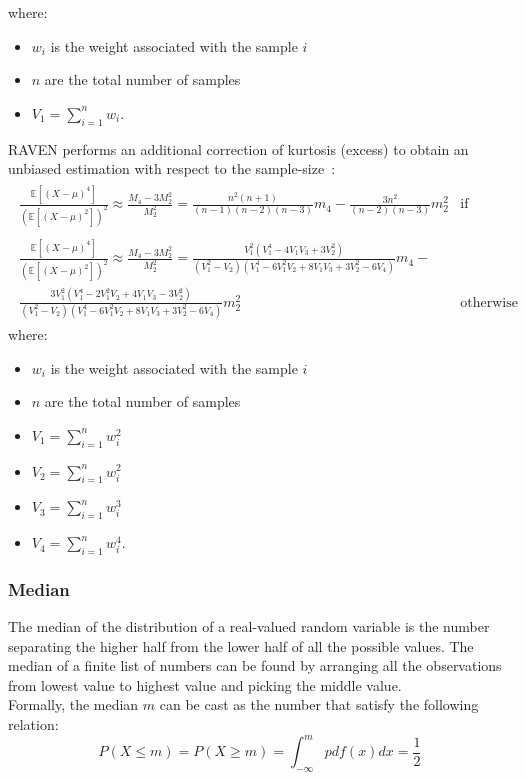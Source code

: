 where:
\begin{itemize}
  \item $w_{i}$ is the weight associated with the sample $i$
  \item $n$ are the total number of samples
  \item $V_{1} = \sum_{i=1}^{n} w_{i}$.
\end{itemize}
RAVEN performs an additional correction of kurtosis (excess) to obtain an unbiased estimation  with respect to the sample-size~\cite{RimoldiniUnbiased}:
\begin{equation}
\begin{split}
\begin{matrix}
\frac{ \mathbb{E}\left [ \left ( X-\mu \right )^{4} \right ]}{\left ( \mathbb{E}\left [ \left ( X-\mu \right )^{2} \right ] \right )^{2}}   \approx \frac{M_{4}-3M_{2}^{2}}{M_{2}^{2}}  = \displaystyle \frac{n^{2}(n+1)}{(n-1)(n-2)(n-3)}m_{4}-\frac{3n^{2}}{(n-2)(n-3)}m_{2}^{2} & \text{if random sampling}  
\\
\\
\frac{ \mathbb{E}\left [ \left ( X-\mu \right )^{4} \right ]}{\left ( \mathbb{E}\left [ \left ( X-\mu \right )^{2} \right ] \right )^{2}}    \approx \frac{M_{4}-3M_{2}^{2}}{M_{2}^{2}}  = \displaystyle  \frac{V_{1}^{2}(V_{1}^{4}-4V_{1}V_{3}+3V_{2}^{2})}{(V_{1}^{2}-V_{2})(V_{1}^{4}-6V_{1}^{2}V_{2}+8V_{1}V_{3}+3V_{2}^{2}-6V_{4})}m_{4}
- \\
\displaystyle \frac{3V_{1}^{2}(V_{1}^{4}-2V_{1}^{2}V_{2}+4V_{1}V_{3}-3V_{2}^{2})}{(V_{1}^{2}-V_{2})(V_{1}^{4}-6V_{1}^{2}V_{2}+8V_{1}V_{3}+3V_{2}^{2}-6V_{4})}m_{2}^{2} & \text{otherwise}
\end{matrix}
\end{split}
\end{equation}
where:
\begin{itemize}
  \item $w_{i}$ is the weight associated with the sample $i$
  \item $n$ are the total number of samples
  \item $V_{1} = \sum_{i=1}^{n} w_{i}^{2}$
  \item $V_{2} = \sum_{i=1}^{n} w_{i}^{2}$
  \item $V_{3} = \sum_{i=1}^{n} w_{i}^{3}$
  \item $V_{4} = \sum_{i=1}^{n} w_{i}^{4}$.
\end{itemize}

\subsubsection{Median}
The median of the distribution of a real-valued random variable is the number separating the higher half from the lower half of all
the possible values. The median of a finite list of numbers can be found by arranging all the observations from lowest value to highest value and picking the middle value.
\\Formally, the median $m$ can be cast as the number that satisfy the following relation:
\begin{equation}
  P(X\leq m) = P(X \geq m) = \int_{-\infty}^{m} pdf(x) dx=\frac{1}{2}
\end{equation}

